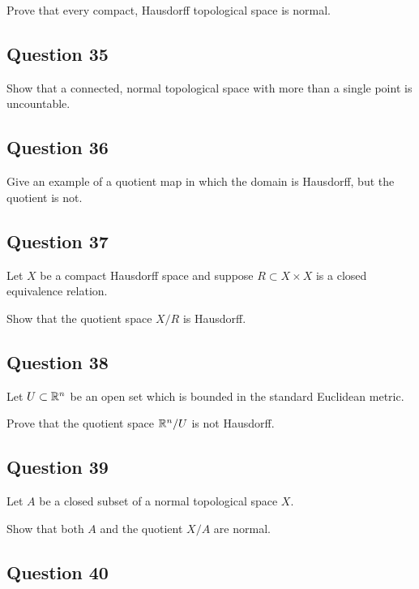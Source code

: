 \documentclass[12pt]{article}
\begin{document}
Prove that every compact, Hausdorff topological space is normal.

\hypertarget{question-35-3}{%
\subsection{Question 35}\label{question-35-3}}

Show that a connected, normal topological space with more than a single
point is uncountable.

\hypertarget{question-36-3}{%
\subsection{Question 36}\label{question-36-3}}

Give an example of a quotient map in which the domain is Hausdorff, but
the quotient is not.

\hypertarget{question-37-3}{%
\subsection{Question 37}\label{question-37-3}}

Let \(X\) be a compact Hausdorff space and suppose
\(R \subset X \times X\) is a closed equivalence relation.

Show that the quotient space \(X/R\) is Hausdorff.

\hypertarget{question-38-3}{%
\subsection{Question 38}\label{question-38-3}}

Let \(U \subset {\mathbb{R}}^n\) be an open set which is bounded in the standard
Euclidean metric.

Prove that the quotient space \({\mathbb{R}}^n / U\) is not Hausdorff.

\hypertarget{question-39-3}{%
\subsection{Question 39}\label{question-39-3}}

Let \(A\) be a closed subset of a normal topological space \(X\).

Show that both \(A\) and the quotient \(X/A\) are normal.

\hypertarget{question-40-3}{%
\subsection{Question 40}\label{question-40-3}}
\end{document}
